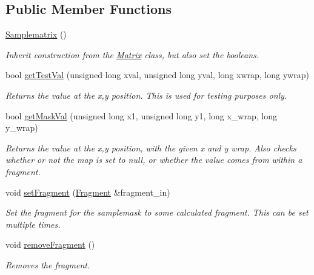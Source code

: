 \subsection*{Public Member Functions}
\begin{DoxyCompactItemize}
\item 
\hyperlink{class_samplematrix_abe3fb4ca1e24678f2720f451cee80492}{Samplematrix} ()\hypertarget{class_samplematrix_abe3fb4ca1e24678f2720f451cee80492}{}\label{class_samplematrix_abe3fb4ca1e24678f2720f451cee80492}

\begin{DoxyCompactList}\small\item\em Inherit construction from the \hyperlink{class_matrix}{Matrix} class, but also set the booleans. \end{DoxyCompactList}\item 
bool \hyperlink{class_samplematrix_a834c750ab142d1ed2241fb9ab559b704}{get\+Test\+Val} (unsigned long xval, unsigned long yval, long xwrap, long ywrap)
\begin{DoxyCompactList}\small\item\em Returns the value at the x,y position. This is used for testing purposes only. \end{DoxyCompactList}\item 
bool \hyperlink{class_samplematrix_a8b494886260857ffdc9f52f47661a628}{get\+Mask\+Val} (unsigned long x1, unsigned long y1, long x\+\_\+wrap, long y\+\_\+wrap)
\begin{DoxyCompactList}\small\item\em Returns the value at the x,y position, with the given x and y wrap. Also checks whether or not the map is set to null, or whether the value comes from within a fragment. \end{DoxyCompactList}\item 
void \hyperlink{class_samplematrix_adbc1732a726c387965f63d4484bd4c25}{set\+Fragment} (\hyperlink{struct_fragment}{Fragment} \&fragment\+\_\+in)
\begin{DoxyCompactList}\small\item\em Set the fragment for the samplemask to some calculated fragment. This can be set multiple times. \end{DoxyCompactList}\item 
void \hyperlink{class_samplematrix_a9b796f2279f1716c2a555ff3d641ea0b}{remove\+Fragment} ()\hypertarget{class_samplematrix_a9b796f2279f1716c2a555ff3d641ea0b}{}\label{class_samplematrix_a9b796f2279f1716c2a555ff3d641ea0b}

\begin{DoxyCompactList}\small\item\em Removes the fragment. \end{DoxyCompactList}\end{DoxyCompactItemize}
